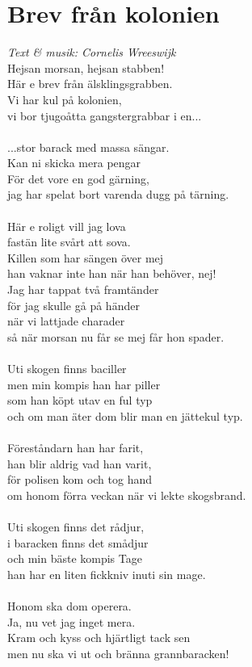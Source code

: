 \section{Brev från kolonien}
\textit{Text \& musik: Cornelis Wreeswijk}
\vspace{2mm}\\
Hejsan morsan, hejsan stabben!\\
Här e brev från älsklingsgrabben.\\
Vi har kul på kolonien,\\
vi bor tjugoåtta gangstergrabbar i en...\\
\\
...stor barack med massa sängar.\\
Kan ni skicka mera pengar\\
För det vore en god gärning,\\
jag har spelat bort varenda dugg på tärning.\\
\\
Här e roligt vill jag lova\\
fastän lite svårt att sova.\\
Killen som har sängen över mej\\
han vaknar inte han när han behöver, nej!\\
\newpage
\noindent Jag har tappat två framtänder\\
för jag skulle gå på händer\\
när vi lattjade charader\\
så när morsan nu får se mej får hon spader.\\
\\
Uti skogen finns baciller\\
men min kompis han har piller\\
som han köpt utav en ful typ\\
och om man äter dom blir man en jättekul typ.\\
\\
Föreståndarn han har farit,\\
han blir aldrig vad han varit,\\
för polisen kom och tog hand\\
om honom förra veckan när vi lekte skogsbrand.\\
\\
Uti skogen finns det rådjur,\\
i baracken finns det smådjur\\
och min bäste kompis Tage\\
han har en liten fickkniv inuti sin mage.\\
\\
Honom ska dom operera.\\
Ja, nu vet jag inget mera.\\
Kram och kyss och hjärtligt tack sen\\
men nu ska vi ut och bränna grannbaracken!

